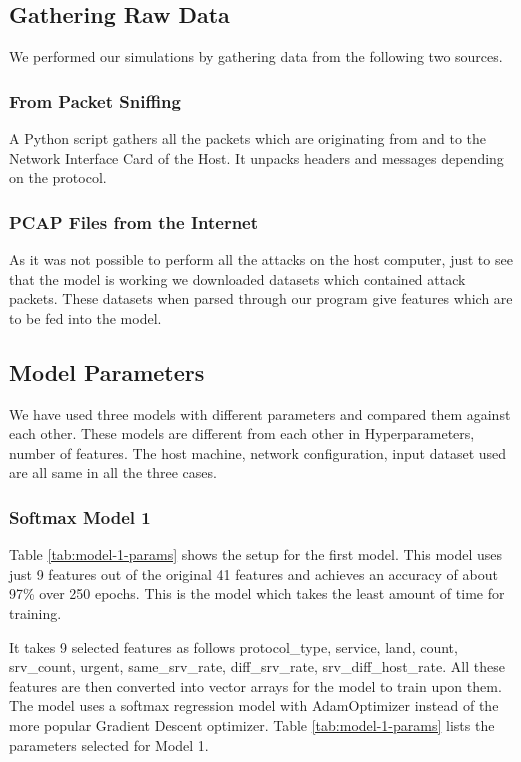 \documentclass[12pt]{article}
\theoremstyle{definition}
\begin{document}
		\subsection{Gathering Raw Data}
		We performed our simulations by gathering data from the following two sources. 
			\subsubsection{From Packet Sniffing}
			A Python script gathers all the packets which are originating from and to the Network Interface Card of the Host. It unpacks headers and messages depending on the protocol.
			
			\subsubsection{PCAP Files from the Internet}
			As it was not possible to perform all the attacks on the host computer, just to see that the model is working we downloaded datasets which contained attack packets. These datasets when parsed through our program give features which are to be fed into the model.
			
			
		\subsection{Model Parameters}
			We have used three models with different parameters and compared them against each other. These models are different from each other in Hyperparameters, number of features. The host machine, network configuration, input dataset used are all same in all the three cases.
			\subsubsection{Softmax Model 1}
			Table \ref{tab:model-1-params} shows the setup for the first model. This model uses just 9 features out of the original 41 features and achieves an accuracy of about 97\% over 250 epochs. This is the model which takes the least amount of time for training. 
			
			It takes 9 selected features as follows  protocol\_type, service, land, count, srv\_count, urgent, same\_srv\_rate, diff\_srv\_rate, srv\_diff\_host\_rate. All these features are then converted into vector arrays for the model to train upon them. The model uses a softmax regression model with AdamOptimizer instead of the more popular Gradient Descent optimizer. Table \ref{tab:model-1-params} lists the parameters selected for Model 1.
			
\end{document}
